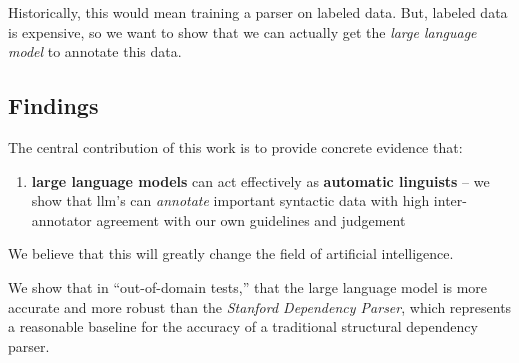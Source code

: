 Historically, this would mean training a parser on labeled data.
But, labeled data is expensive, so we want to show that we can actually get the {\em large language model} to annotate this data.

\subsection{Findings}
The central contribution of this work is to provide concrete evidence that:
\begin{enumerate}
    \item {\bf large language models} can act effectively as {\bf automatic linguists} -- we show that llm's can {\em annotate} important syntactic data with high inter-annotator agreement with our own guidelines and judgement
\end{enumerate}
We believe that this will greatly change the field of artificial intelligence.

We show that in ``out-of-domain tests,'' that the large language model is more accurate and more robust than the {\em Stanford Dependency Parser}, which represents a reasonable baseline for the accuracy of a traditional structural dependency parser.

